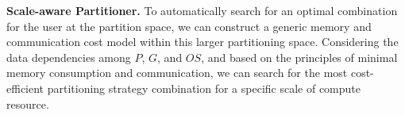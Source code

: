 




\noindent\textbf{Scale-aware Partitioner.}
To automatically search for an optimal combination for the user at the partition space, we can construct a generic memory and communication cost model within this larger partitioning space. Considering the data dependencies among $P$, $G$, and $OS$, and based on the principles of minimal memory consumption and communication, we can search for the most cost-efficient partitioning strategy combination for a specific scale of compute resource.

